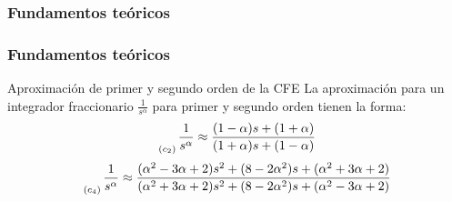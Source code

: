 \documentclass[10pt]{beamer}
\begin{document}
	\begin{frame}
		\frametitle{Fundamentos teóricos}
	\end{frame}		
	\begin{frame}
		\frametitle{Fundamentos teóricos}
		\begin{block}{Aproximación de primer y segundo orden de la CFE}
		\justifying
			La aproximación para un integrador fraccionario $\frac{1}{s^{\alpha}}$ para primer y segundo orden tienen la forma:
			\vspace{0.25cm}
			\begin{equation}
				\genfrac{}{}{0pt}{0}{}{_{(c_{2})}} \frac{1}{s^{\alpha}} \approx \frac{(1 - \alpha)s + (1 + \alpha) }{(1 + \alpha)s + (1 - \alpha)} 
			\end{equation}
			\vspace{0.25cm}
			\begin{equation}
		\genfrac{}{}{0pt}{0}{}{_{(c_{4})}} \frac{1}{s^{\alpha}} \approx \frac{(\alpha^{2} - 3\alpha + 2) s^{2} + (8 - 2 \alpha^{2})s + (\alpha^{2} + 3\alpha + 2) }{(\alpha^{2} + 3\alpha + 2) s^{2} + (8 - 2 \alpha^{2})s + (\alpha^{2} - 3\alpha + 2)}
	\end{equation}
		\end{block}
	\end{frame}	
\end{document}
